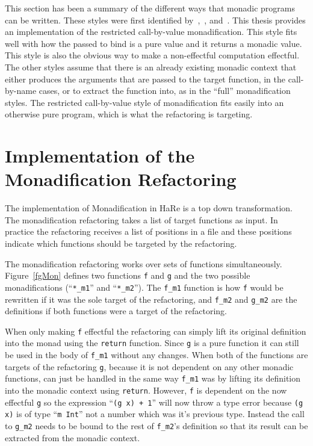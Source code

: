 This section has been a summary of the different ways that monadic programs can be written. These styles were first identified by~\cite{lammelReuse},~\cite{monadification}, and~\cite{monadSurvey}. This thesis provides an implementation of the restricted call-by-value monadification. This style fits well with how the passed to bind is a pure value and it returns a monadic value. This style is also the obvious way to make a non-effectful computation effectful. The other styles assume that there is an already existing monadic context that either produces the arguments that are passed to the target function, in the call-by-name cases, or to extract the function into, as in the ``full'' monadification styles. The restricted call-by-value style of monadification fits easily into an otherwise pure program, which is what the refactoring is targeting.  

\section{Implementation of the Monadification Refactoring}
\label{monadImp}

The implementation of Monadification in HaRe is a top down transformation. The monadification refactoring takes a list of target functions as input. In practice the refactoring receives a list of positions in a file and these positions indicate which functions should be targeted by the refactoring.

The monadification refactoring works over sets of functions simultaneously. Figure~\ref{fgMon} defines two functions \texttt{f} and \texttt{g} and the two possible monadifications (``\texttt{*\_m1}'' and ``\texttt{*\_m2}''). The \texttt{f\_m1} function is how \texttt{f} would be rewritten if it was the sole target of the refactoring, and \texttt{f\_m2} and \texttt{g\_m2} are the definitions if both functions were a target of the refactoring.

When only making \texttt{f} effectful the refactoring can simply lift its original definition into the monad using the \texttt{return} function. Since \texttt{g} is a pure function it can still be used in the body of \texttt{f\_m1} without any changes. When both of the functions are targets of the refactoring \texttt{g}, because it is not dependent on any other monadic functions, can just be handled in the same way \texttt{f\_m1} was by lifting its definition into the monadic context using \texttt{return}. However, \texttt{f} is dependent on the now effectful \texttt{g} so the expression ``\texttt{(g x) + 1}'' will now throw a type error because \texttt{(g x)} is of type ``\texttt{m Int}'' not a number which was it's previous type. Instead the call to \texttt{g\_m2} needs to be bound to the rest of \texttt{f\_m2}'s definition so that its result can be extracted from the monadic context.

